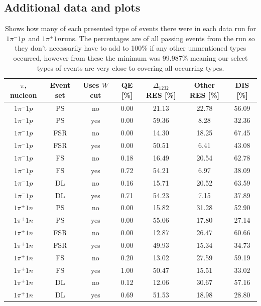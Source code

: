 \documentclass[a4paper,12pt]{article}
\newcommand{\md}{$1\pi^-1p$}
\newcommand{\pd}{$1\pi^+1n$}
\begin{document}
\begin{appendices}
    \section{Additional data and plots}\label{app:extra}
    \begin{table}[H]
        \begin{center}
            \begin{tabular}{ c | c | c | c | c | c | c }
                $\pi$, nucleon & Event set & Uses $W$ cut & QE [\%] & $\Delta_{1232}$ RES [\%] & Other RES [\%] & DIS [\%] \\
                \hline
                $1\pi^-1p$ & PS & no & 0.00 & 21.13 & 22.78 & 56.09 \\
                $1\pi^-1p$ & PS & yes & 0.00 & 59.36 & 8.28 & 32.36 \\
                $1\pi^-1p$ & FSR & no & 0.00 & 14.30 & 18.25 & 67.45 \\
                $1\pi^-1p$ & FSR & yes & 0.00 & 50.51 & 6.41 & 43.08 \\
                $1\pi^-1p$ & FS & no & 0.18 & 16.49 & 20.54 & 62.78 \\
                $1\pi^-1p$ & FS & yes & 0.72 & 54.21 & 6.97 & 38.09 \\
                $1\pi^-1p$ & DL & no & 0.16 & 15.71 & 20.52 & 63.59 \\
                $1\pi^-1p$ & DL & yes & 0.71 & 54.23 & 7.15 & 37.89 \\
                $1\pi^+1n$ & PS & no & 0.00 & 15.82 & 31.28 & 52.90 \\
                $1\pi^+1n$ & PS & yes & 0.00 & 55.06 & 17.80 & 27.14 \\
                $1\pi^+1n$ & FSR & no & 0.00 & 12.87 & 26.47 & 60.66 \\
                $1\pi^+1n$ & FSR & yes & 0.00 & 49.93 & 15.34 & 34.73 \\
                $1\pi^+1n$ & FS & no & 0.20 & 13.02 & 27.59 & 59.19 \\
                $1\pi^+1n$ & FS & yes & 1.00 & 50.47 & 15.51 & 33.02 \\
                $1\pi^+1n$ & DL & no & 0.12 & 12.06 & 30.67 & 57.16 \\
                $1\pi^+1n$ & DL & yes & 0.69 & 51.53 & 18.98 & 28.80
            \end{tabular}
        \end{center}
        \caption{
            Shows how many of each presented type of events there were in each data run for \md\ and \pd runs.
            The percentages are of all passing events from the run so they don't necessarily have to add to 100\% if any other unmentioned types occurred, however from these the minimum was 99.987\% meaning our select types of events are very close to covering all occurring types.
        }\label{fig:extra1}
    \end{table}


\end{appendices}
\end{document}
